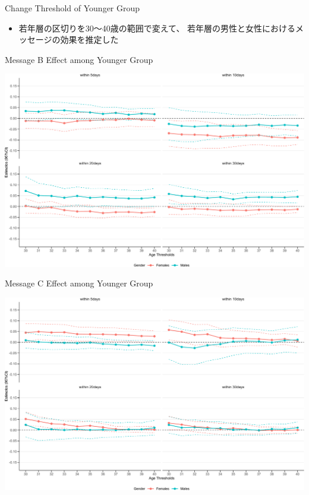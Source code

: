 \documentclass[
      aspectratio=169,
        12pt,
    ]{beamer}
\providecommand{\tightlist}{%
  \setlength{\itemsep}{0pt}\setlength{\parskip}{0pt}}
\begin{document}
\begin{frame}{Change Threshold of Younger Group}
\protect\hypertarget{change-threshold-of-younger-group-1}{}
\begin{itemize}
\tightlist
\item
  若年層の区切りを30～40歳の範囲で変えて、
  若年層の男性と女性におけるメッセージの効果を推定した
\end{itemize}
\end{frame}

\begin{frame}{Message B Effect among Younger Group}
\protect\hypertarget{message-b-effect-among-younger-group-1}{}
\begin{center}\includegraphics[width=0.75\linewidth]{report_files/figure-beamer/plotB-change-age-threshold-secondary-1} \end{center}
\end{frame}

\begin{frame}{Message C Effect among Younger Group}
\protect\hypertarget{message-c-effect-among-younger-group-1}{}
\begin{center}\includegraphics[width=0.75\linewidth]{report_files/figure-beamer/plotC-change-age-threshold-secondary-1} \end{center}
\end{frame}
\end{document}
